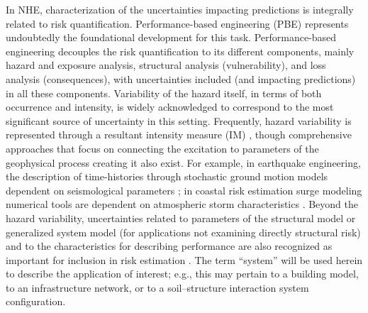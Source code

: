 In NHE, characterization of the uncertainties impacting predictions is integrally related to risk quantification. Performance-based engineering (PBE) \citep{whittaker2003performancebased, goulet2007evaluation, riggs2008experimental, ciampoli2011performancebased,  barbato2013performancebased, fischer2019performancebased} represents undoubtedly the foundational development for this task. Performance-based engineering decouples the risk quantification to its different components, mainly hazard and exposure analysis, structural analysis (vulnerability), and loss analysis (consequences), with uncertainties included (and impacting predictions) in all these components. Variability of the hazard itself, in terms of both occurrence and intensity, is widely acknowledged to correspond to the most significant source of uncertainty in this setting. Frequently, hazard variability is represented through a resultant intensity measure (IM) \citep{baker2005vectorvalued, kohrangi2016implications}, though comprehensive approaches that focus on connecting the excitation to parameters of the geophysical process creating it also exist. For example, in earthquake engineering, the description of time-histories through stochastic ground motion models dependent on seismological parameters \citep{bijelic2018validation, vlachos2018predictive}; in coastal risk estimation surge modeling numerical tools are dependent on atmospheric storm characteristics \citep{resio2007white}. Beyond the hazard variability, uncertainties related to parameters of the structural model or generalized system model (for applications not examining directly structural risk) and to the characteristics for describing performance are also recognized as important for inclusion in risk estimation \citep{porter2002sensitivity}. The term ``system'' will be used herein to describe the application of interest; e.g., this may pertain to a building model, to an infrastructure network, or to a soil--structure interaction system configuration. 

